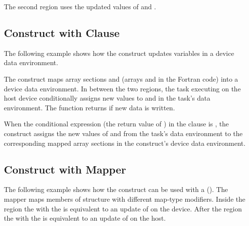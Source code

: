 The second  region uses the updated values of  and .



\subsection{ Construct with  Clause}
\label{subsec:target_update_if}

The following example shows how the  construct updates
variables in a device data environment.

The  construct maps array sections  and 
(arrays  and  in the Fortran code) into a device data environment. In between 
the two  regions, the task executing on the host device conditionally 
assigns new values to  and  in the task's data environment. The function  
returns  if new data is written.

When the conditional expression (the return value of ) in the 
 clause is , the  construct
assigns the new values of  and  from the task's data environment to the corresponding 
mapped array sections in the  construct's device data
environment.



\subsection{ Construct with Mapper}
\label{subsec:target_update_mapper}

The following example shows how the  construct can be used with a  ().
The  mapper maps members of structure  with different map-type modifiers. Inside the 
 region the  with the 
 is equivalent to an update of  on the
device. After the  region the  with the
  is equivalent to an update of  on the host.



